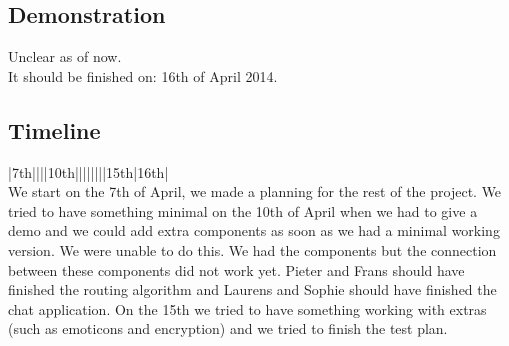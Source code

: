 \documentclass{article}
\begin{document}
    \subsection{Demonstration}
    Unclear as of now. \\
    It should be finished on: 16th of April 2014.

    \subsection{Timeline}

    |7th||||10th||||||||15th|16th| \\
    We start on the 7th of April, we made a planning for the rest of the project. We tried to have something minimal on the 10th of April when we had to give a demo and we could add extra components as soon as we had a minimal working version.
    We were unable to do this. We had the components but the connection between these components did not work yet.
    Pieter and Frans should have finished the routing algorithm and Laurens and Sophie should have finished the chat application.
    On the 15th we tried to have something working with extras (such as emoticons and encryption) and we tried to finish the test plan.
\end{document}
